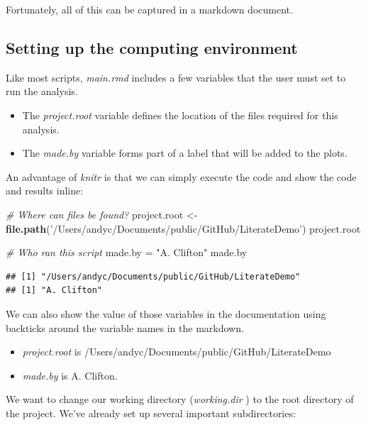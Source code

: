 \documentclass[10pt,]{article}
\newenvironment{Shaded}{\begin{snugshade}}{\end{snugshade}}
\newcommand{\CommentTok}[1]{\textcolor[rgb]{0.56,0.35,0.01}{\textit{#1}}}
\newcommand{\KeywordTok}[1]{\textcolor[rgb]{0.13,0.29,0.53}{\textbf{#1}}}
\newcommand{\NormalTok}[1]{#1}
\newcommand{\StringTok}[1]{\textcolor[rgb]{0.31,0.60,0.02}{#1}}
\providecommand{\tightlist}{%
  \setlength{\itemsep}{0pt}\setlength{\parskip}{0pt}}
\begin{document}
Fortunately, all of this can be captured in a markdown document.

\hypertarget{setting-up-the-computing-environment}{%
\subsection{Setting up the computing environment}\label{setting-up-the-computing-environment}}

Like most scripts, \emph{main.rmd} includes a few variables that the user must set to run the analysis.

\begin{itemize}
\tightlist
\item
  The \emph{project.root} variable defines the location of the files required for this analysis.
\item
  The \emph{made.by} variable forms part of a label that will be added to the plots.
\end{itemize}

An advantage of \emph{knitr} is that we can simply execute the code and show the code and results inline:

\begin{Shaded}
\begin{Highlighting}[]
\CommentTok{# Where can files be found?}
\NormalTok{project.root <-}\StringTok{ }\KeywordTok{file.path}\NormalTok{(}\StringTok{'/Users/andyc/Documents/public/GitHub/LiterateDemo'}\NormalTok{)}
\NormalTok{project.root}

\CommentTok{# Who ran this script}
\NormalTok{made.by =}\StringTok{ "A. Clifton"}
\NormalTok{made.by}
\end{Highlighting}
\end{Shaded}

\begin{verbatim}
## [1] "/Users/andyc/Documents/public/GitHub/LiterateDemo"
## [1] "A. Clifton"
\end{verbatim}

We can also show the value of those variables in the documentation using backticks around the variable names in the markdown.

\begin{itemize}
\tightlist
\item
  \emph{project.root} is /Users/andyc/Documents/public/GitHub/LiterateDemo
\item
  \emph{made.by} is A. Clifton.
\end{itemize}

We want to change our working directory (\emph{working.dir} ) to the root directory of the project. We've already set up several important subdirectories:
\end{document}
